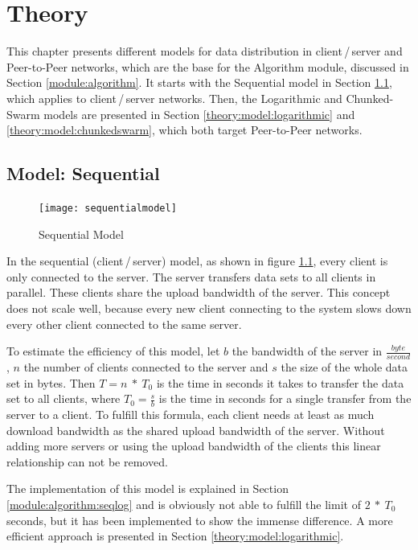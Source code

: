 
\chapter{Theory}
\label{theory}

This chapter presents different models for data distribution in client\,/\,server and Peer-to-Peer networks, which are the base for the Algorithm module, discussed in Section \ref{module:algorithm}. It starts with the Sequential model in Section \ref{theory:model:sequential}, which applies to client\,/\,server networks. Then, the Logarithmic and Chunked-Swarm models are presented in Section \ref{theory:model:logarithmic} and \ref{theory:model:chunkedswarm}, which both target Peer-to-Peer networks.

\section{Model: Sequential}
\label{theory:model:sequential}

\begin{figure}[ht]
	\centering
	\texttt{[image: sequentialmodel]}
	\caption{Sequential Model}
	\label{fig:sequentialmodel}
\end{figure}

In the sequential (client\,/\,server) model, as shown in figure \ref{fig:sequentialmodel}, every client is only connected to the server. The server transfers data sets to all clients in parallel. These clients share the upload bandwidth of the server. This concept does not scale well, because every new client connecting to the system slows down every other client connected to the same server. 

To estimate the efficiency of this model, let $b$ the bandwidth of the server in $\frac{byte}{second}$, $n$ the number of clients connected to the server and $s$ the size of the whole data set in bytes. Then $T= n\:*\:T_0$ is the time in seconds it takes to transfer the data set to all clients, where $T_0=\frac{s}{b}$ is the time in seconds for a single transfer from the server to a client. To fulfill this formula, each client needs at least as much download bandwidth as the shared upload bandwidth of the server. Without adding more servers or using the upload bandwidth of the clients this linear relationship can not be removed. 

The implementation of this model is explained in Section \ref{module:algorithm:seqlog} and is obviously not able to fulfill the limit of $2\:*\:T_0$ seconds, but it has been implemented to show the immense difference. A more efficient approach is presented in Section \ref{theory:model:logarithmic}.

